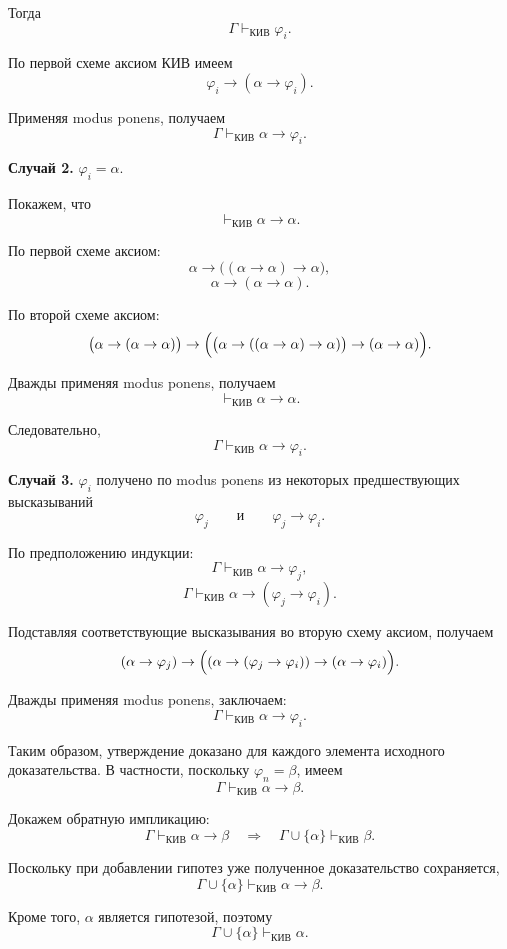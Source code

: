 \documentclass[12pt,a4paper,oneside,openany]{book}
\theoremstyle{definition}
\theoremstyle{plain}
\theoremstyle{remark}
\begin{document}
Тогда
\[
\Gamma\vdash_{\mathrm{КИВ}}\varphi_i.
\]

По первой схеме аксиом КИВ имеем
\[
\varphi_i\to(\alpha\to\varphi_i).
\]

Применяя modus ponens, получаем
\[
\Gamma\vdash_{\mathrm{КИВ}}\alpha\to\varphi_i.
\]

\textbf{Случай 2.}
\(\varphi_i=\alpha\).

Покажем, что
\[
\vdash_{\mathrm{КИВ}}\alpha\to\alpha.
\]

По первой схеме аксиом:
\[
\alpha\to\bigl((\alpha\to\alpha)\to\alpha\bigr),
\]
\[
\alpha\to(\alpha\to\alpha).
\]

По второй схеме аксиом:
\[
\bigl(\alpha\to(\alpha\to\alpha)\bigr)
\to
\Bigl(
    \bigl(\alpha\to((\alpha\to\alpha)\to\alpha)\bigr)
    \to
    (\alpha\to\alpha)
\Bigr).
\]

Дважды применяя modus ponens, получаем
\[
\vdash_{\mathrm{КИВ}}\alpha\to\alpha.
\]

Следовательно,
\[
\Gamma\vdash_{\mathrm{КИВ}}\alpha\to\varphi_i.
\]

\textbf{Случай 3.}
\(\varphi_i\) получено по modus ponens из некоторых предшествующих
высказываний
\[
\varphi_j
\qquad\text{и}\qquad
\varphi_j\to\varphi_i.
\]

По предположению индукции:
\[
\Gamma\vdash_{\mathrm{КИВ}}\alpha\to\varphi_j,
\]
\[
\Gamma\vdash_{\mathrm{КИВ}}
\alpha\to(\varphi_j\to\varphi_i).
\]

Подставляя соответствующие высказывания во вторую схему аксиом,
получаем
\[
(\alpha\to\varphi_j)
\to
\Bigl(
    (\alpha\to(\varphi_j\to\varphi_i))
    \to
    (\alpha\to\varphi_i)
\Bigr).
\]

Дважды применяя modus ponens, заключаем:
\[
\Gamma\vdash_{\mathrm{КИВ}}\alpha\to\varphi_i.
\]

Таким образом, утверждение доказано для каждого элемента исходного
доказательства. В частности, поскольку \(\varphi_n=\beta\), имеем
\[
\Gamma\vdash_{\mathrm{КИВ}}\alpha\to\beta.
\]

Докажем обратную импликацию:
\[
\Gamma\vdash_{\mathrm{КИВ}}\alpha\to\beta
\quad\Longrightarrow\quad
\Gamma\cup\{\alpha\}\vdash_{\mathrm{КИВ}}\beta.
\]

Поскольку при добавлении гипотез уже полученное доказательство
сохраняется,
\[
\Gamma\cup\{\alpha\}
\vdash_{\mathrm{КИВ}}
\alpha\to\beta.
\]

Кроме того, \(\alpha\) является гипотезой, поэтому
\[
\Gamma\cup\{\alpha\}\vdash_{\mathrm{КИВ}}\alpha.
\]
\end{document}
